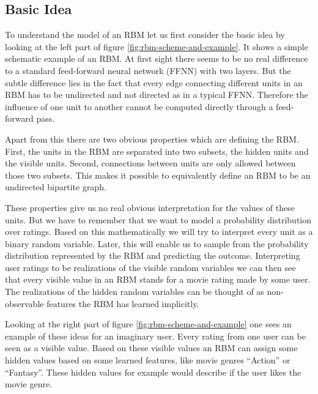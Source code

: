 \documentclass[crop=false,10pt]{standalone}
\begin{document}
    \subsection{Basic Idea} %
    \label{sub:basic_idea}
      To understand the model of an RBM let us first consider the basic idea by looking at the left part of figure \ref{fig:rbm-scheme-and-example}.
      It shows a simple schematic example of an RBM.
      At first sight there seems to be no real difference to a standard feed-forward neural network (FFNN) with two layers.
      But the subtle difference lies in the fact that every edge connecting different units in an RBM has to be undirected and not directed as in a typical FFNN.
      Therefore the influence of one unit to another cannot be computed directly through a feed-forward pass.
      \cite{Murphy2012}

      Apart from this there are two obvious properties which are defining the RBM.
      First, the units in the RBM are separated into two subsets, the hidden units and the visible units.
      Second, connections between units are only allowed between those two subsets.
      This makes it possible to equivalently define an RBM to be an undirected bipartite graph.
      \cite{Murphy2012,Montufar2018}

      These properties give us no real obvious interpretation for the values of these units.
      But we have to remember that we want to model a probability distribution over ratings.
      Based on this mathematically we will try to interpret every unit as a binary random variable.
      Later, this will enable us to sample from the probability distribution represented by the RBM and predicting the outcome.
      Interpreting user ratings to be realizations of the visible random variables we can then see that every visible value in an RBM stands for a movie rating made by some user.
      The realizations of the hidden random variables can be thought of as non-observable features the RBM has learned implicitly.
      \cite{Hinton2007,Murphy2012,Montufar2018}

      Looking at the right part of figure \ref{fig:rbm-scheme-and-example} one sees an example of these ideas for an imaginary user.
      Every rating from one user can be seen as a visible value.
      Based on these visible values an RBM can assign some hidden values based on some learned features, like movie genres \enquote{Action} or \enquote{Fantasy}.
      These hidden values for example would describe if the user likes the movie genre.
      \cite{towardsdatascience}
\end{document}
